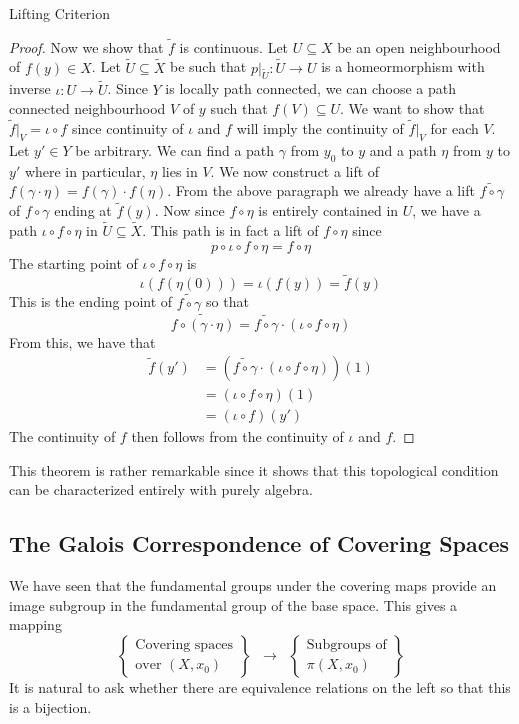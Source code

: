 \documentclass[a4paper]{article}
\begin{document}
\begin{thm}{Lifting Criterion}{}
\begin{proof}
Now we show that $\tilde{f}$ is continuous. Let $U\subseteq X$ be an open neighbourhood of $f(y)\in X$. Let $\tilde{U}\subseteq\tilde{X}$ be such that $p|_{\tilde{U}}:\tilde{U}\to U$ is a homeormorphism with inverse $\iota:U\to\tilde{U}$. Since $Y$ is locally path connected, we can choose a path connected neighbourhood $V$ of $y$ such that $f(V)\subseteq U$. We want to show that $\tilde{f}|_V=\iota\circ f$ since continuity of $\iota$ and $f$ will imply the continuity of $\tilde{f}|_V$ for each $V$. Let $y'\in Y$ be arbitrary. We can find a path $\gamma$ from $y_0$ to $y$ and a path $\eta$ from $y$ to $y'$ where in particular, $\eta$ lies in $V$. We now construct a lift of $f(\gamma\cdot\eta)=f(\gamma)\cdot f(\eta)$. From the above paragraph we already have a lift $\widetilde{f\circ\gamma}$ of $f\circ\gamma$ ending at $\tilde{f}(y)$. Now since $f\circ\eta$ is entirely contained in $U$, we have a path $\iota\circ f\circ\eta$ in $\tilde{U}\subseteq\tilde{X}$. This path is in fact a lift of $f\circ\eta$ since $$p\circ\iota\circ f\circ\eta=f\circ\eta$$ The starting point of $\iota\circ f\circ\eta$ is $$\iota(f(\eta(0)))=\iota(f(y))=\tilde{f}(y)$$ This is the ending point of $\tilde{f\circ\gamma}$ so that $$\widetilde{f\circ(\gamma\cdot\eta)}=\widetilde{f\circ\gamma}\cdot(\iota\circ f\circ\eta)$$ From this, we have that 
\begin{align*}
\tilde{f}(y')&=\left(\widetilde{f\circ\gamma}\cdot(\iota\circ f\circ\eta)\right)(1)\\
&=\left(\iota\circ f\circ\eta\right)(1)\\
&=(\iota\circ f)(y')
\end{align*}
The continuity of $f$ then follows from the continuity of $\iota$ and $f$. 
\end{proof}
\end{thm}

This theorem is rather remarkable since it shows that this topological condition can be characterized entirely with purely algebra. 

\subsection{The Galois Correspondence of Covering Spaces}
We have seen that the fundamental groups under the covering maps provide an image subgroup in the fundamental group of the base space. This gives a mapping $$\left\{\substack{\text{Covering spaces}\\\text{over }(X,x_0)}\right\}\;\;\longrightarrow\;\;\left\{\substack{\text{Subgroups of}\\ \pi(X,x_0)}\right\}$$ It is natural to ask whether there are equivalence relations on the left so that this is a bijection. 
\end{document}
